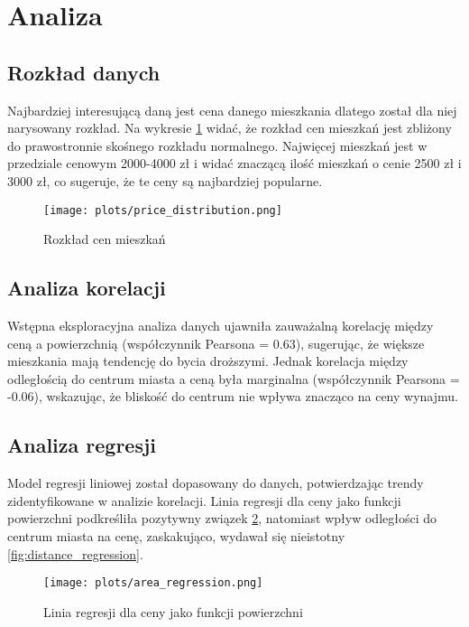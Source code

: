 \documentclass[12pt]{article}
\begin{document}
\section{Analiza}
\subsection{Rozkład danych}
Najbardziej interesującą daną jest cena danego mieszkania dlatego został dla niej narysowany rozkład. Na wykresie \ref{fig:price_distribution} widać, że rozkład cen mieszkań jest zbliżony do prawostronnie skośnego rozkładu normalnego. Najwięcej mieszkań jest w przedziale cenowym 2000-4000 zł i widać znaczącą ilość mieszkań o cenie 2500 zł i 3000 zł, co sugeruje, że te ceny są najbardziej popularne.

\begin{figure}[h]
  \centering
  \texttt{[image: plots/price\_distribution.png]}
  \caption{Rozkład cen mieszkań}
  \label{fig:price_distribution}
\end{figure}

\subsection{Analiza korelacji}
Wstępna eksploracyjna analiza danych ujawniła zauważalną korelację między ceną a powierzchnią (współczynnik Pearsona = 0.63), sugerując, że większe mieszkania mają tendencję do bycia droższymi. Jednak korelacja między odległością do centrum miasta a ceną była marginalna (współczynnik Pearsona = -0.06), wskazując, że bliskość do centrum  nie wpływa znacząco na ceny wynajmu.


\subsection{Analiza regresji}
Model regresji liniowej został dopasowany do danych, potwierdzając trendy zidentyfikowane w analizie korelacji. Linia regresji dla ceny jako funkcji powierzchni podkreśliła pozytywny związek \ref{fig:area_regression}, natomiast wpływ odległości do centrum miasta na cenę, zaskakująco, wydawał się nieistotny \ref{fig:distance_regression}.

\begin{figure}[h]
  \centering
  \texttt{[image: plots/area\_regression.png]}
  \caption{Linia regresji dla ceny jako funkcji powierzchni}
  \label{fig:area_regression}
\end{figure}
\end{document}
